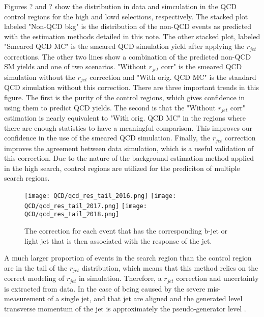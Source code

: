 Figures ? and ? show the \met{} distribution in data and simculation in the QCD control regions for the high \dm{} and lowd \dm{} selections, respectively. The stacked plot labeled "Non-QCD bkg" is the distribution of the non-QCD events as predicted with the estimation methods detailed in this note. The other stacked plot, labeled "Smeared QCD MC" is the smeared QCD simulation yield after applying the $r_{jet}$ corrections. The other two lines show a combination of the predicted non-QCD SM yields and one of two scenarios. "Without $r_{jet}$ corr" is the smeared QCD simulation without the $r_{jet}$ correction and "With orig. QCD MC" is the standard QCD simulation without this correction. There are three important trends in this figure. The first is the purity of the control regions, which gives confidence in using them to predict QCD yields. The second is that the "Without $r_{jet}$ corr" estimation is nearly equivalent to "With orig. QCD MC" in the regions where there are enough statistics to have a meaningful comparison. This improves our confidence in the use of the smeared QCD simulation. Finally, the $r_{jet}$ correction improves the agreement between data simulation, which is a useful validation of this correction. Due to the nature of the background estimation method applied in the high \dm{} search, control regions are utilized for the prediciton of multiple search regions. 

\begin{figure}
	\begin{center}
  \texttt{[image: QCD/qcd\_res\_tail\_2016.png]}
  \texttt{[image: QCD/qcd\_res\_tail\_2017.png]}
  \texttt{[image: QCD/qcd\_res\_tail\_2018.png]}
	\end{center}
	\caption[QCD Jet Response for eah b-jet and light jet]{The correction for each event that has the corresponding b-jet or light jet that is then associated with the response of the jet. }
	\label{fig:qcd-cr-response-corr}
\end{figure}

A much larger proportion of events in the search region than the control region are in the tail of the $r_{jet}$ distribution, which means that this method relies on the correct modeling of $r_{jet}$ in simulation. Therefore, a $r_{jet}$ correction and uncertainty is extracted from data. In the case of \met{} being caused by the severe mis-measurement of a single jet, \met{} and that jet are aligned and the generated level transverse momentum of the jet is approximately the pseudo-generator level \pt.

